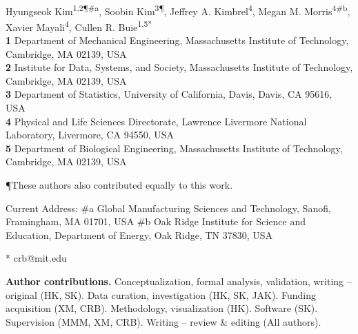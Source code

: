 \documentclass[10pt,letterpaper]{article}
\newcommand{\1}{{\rm 1}\kern-0.24em{\rm I}}
\begin{document}
\vspace*{0.2in}

\begin{flushleft}
{\Large
\textbf{}
}
\newline
\\
Hyungseok Kim\textsuperscript{1,2\P \#\!a},
Soobin Kim\textsuperscript{3\P},
Jeffrey A. Kimbrel\textsuperscript{4},
Megan M. Morris\textsuperscript{4\#\!b},
Xavier Mayali\textsuperscript{4},
Cullen R. Buie\textsuperscript{1,5*}
\\
\bigskip
\textbf{1} Department of Mechanical Engineering, Massachusetts Institute of Technology, Cambridge, MA 02139, USA
\\
\textbf{2} Institute for Data, Systems, and Society, Massachusetts Institute of Technology, Cambridge, MA 02139, USA
\\
\textbf{3} Department of Statistics, University of California, Davis, Davis, CA 95616, USA
\\
\textbf{4} Physical and Life Sciences Directorate, Lawrence Livermore National Laboratory, Livermore, CA 94550, USA
\\
\textbf{5} Department of Biological Engineering, Massachusetts Institute of Technology, Cambridge, MA 02139, USA
\\
\bigskip

\P These authors also contributed equally to this work.

Current Address: \#\!a Global Manufacturing Sciences and Technology, Sanofi, Framingham, MA 01701, USA
\#\!b Oak Ridge Institute for Science and Education, Department of Energy, Oak Ridge, TN 37830, USA 

* crb@mit.edu

\textbf{Author contributions.} Conceptualization, formal analysis, validation, writing – original (HK, SK). Data curation, investigation (HK, SK, JAK). Funding acquisition (XM, CRB). Methodology, visualization (HK). Software (SK). Supervision (MMM, XM, CRB).  Writing – review \& editing (All authors).

\end{flushleft}
\end{document}

